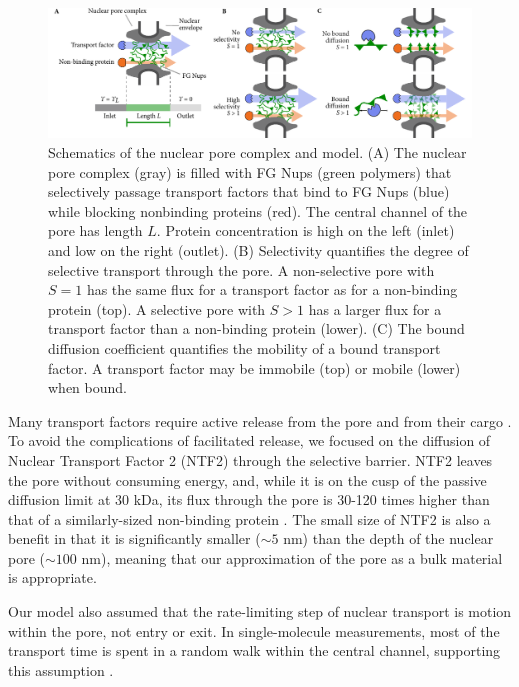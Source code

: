 \begin{figure}[t!]
\centering
\includegraphics[width=17.8cm]{figs/ch02/fig1.pdf}
\caption[Schematics of the nuclear pore complex and model.]{Schematics of the nuclear pore complex and model. (A) The
  nuclear pore complex (gray) is filled with FG Nups (green polymers)
  that selectively passage transport factors that bind to FG Nups
  (blue) while blocking nonbinding proteins (red). The central
  channel of the pore has length $L$. Protein concentration is high on
  the left (inlet) and low on the right (outlet).  (B) Selectivity
  quantifies the degree of selective transport through the pore. A
  non-selective pore with $S=1$ has the same flux for a transport
  factor as for a non-binding protein (top). A selective pore with
  $S>1$ has a larger flux for a transport factor than a non-binding
  protein (lower). (C) The bound diffusion coefficient quantifies the
  mobility of a bound transport factor.  A transport factor may be
  immobile (top) or mobile (lower) when bound. }
\label{fig:cartoon}
\end{figure}

Many transport factors require active release from the pore and from their cargo \cite{lowe15, mincer11, gorlich96, gilchrist02}.  To avoid the complications of facilitated release, we focused on the diffusion of Nuclear Transport Factor 2 (NTF2) through the selective barrier.  NTF2 leaves the pore without consuming energy, and, while it is on the cusp of the passive  diffusion limit at 30 kDa, its flux through the pore is 30-120 times higher than that of a similarly-sized non-binding protein \cite{mincer11, zilman07}.  The small size of NTF2 is also a benefit in that it is significantly smaller ($\sim 5$ nm) than the depth of the nuclear pore ($\sim 100$ nm), meaning that our approximation of the pore as a bulk material is appropriate.

Our model also assumed that the rate-limiting step of nuclear transport is motion within the pore, not entry or exit.  In single-molecule measurements, most of the transport time is spent in a random walk within the central channel, supporting this assumption \cite{yang04, tu13}.

